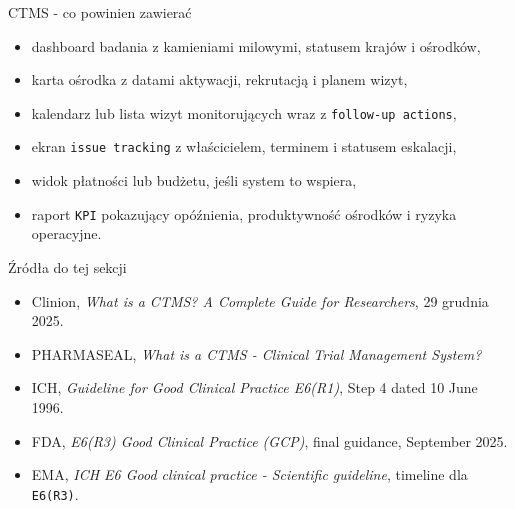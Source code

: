 
\begin{frame}{CTMS - co powinien zawierać}
  \begin{itemize}
    \item dashboard badania z kamieniami milowymi, statusem krajów i ośrodków,
    \item karta ośrodka z datami aktywacji, rekrutacją i planem wizyt,
    \item kalendarz lub lista wizyt monitorujących wraz z \texttt{follow-up actions},
    \item ekran \texttt{issue tracking} z właścicielem, terminem i statusem eskalacji,
    \item widok płatności lub budżetu, jeśli system to wspiera,
    \item raport \texttt{KPI} pokazujący opóźnienia, produktywność ośrodków i ryzyka operacyjne.
  \end{itemize}
\end{frame}


\begin{frame}{Źródła do tej sekcji}
  \footnotesize
  \begin{itemize}
    \item Clinion, \textit{What is a CTMS? A Complete Guide for Researchers}, 29 grudnia 2025.
    \item PHARMASEAL, \textit{What is a CTMS - Clinical Trial Management System?}
    \item ICH, \textit{Guideline for Good Clinical Practice E6(R1)}, Step 4 dated 10 June 1996.
    \item FDA, \textit{E6(R3) Good Clinical Practice (GCP)}, final guidance, September 2025.
    \item EMA, \textit{ICH E6 Good clinical practice - Scientific guideline}, timeline dla \texttt{E6(R3)}.
  \end{itemize}
\end{frame}
